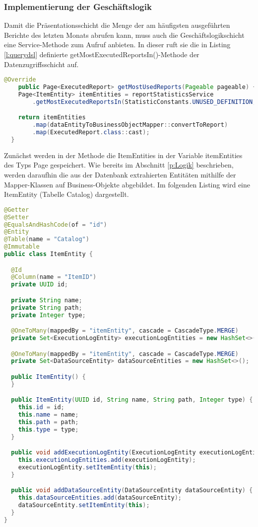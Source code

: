 \subsubsection{Implementierung der Geschäftslogik}
\label{sec:ImplementierungGeschaeftslogik}
Damit die Präsentationsschicht die Menge der am häufigsten ausgeführten Berichte des letzten Monats abrufen kann, muss auch die Geschäftslogikschicht eine Service-Methode zum Aufruf anbieten. In dieser ruft sie die in Listing \ref{l:querydsl} definierte getMostExecutedReportsIn()-Methode der Datenzugriffsschicht auf.
\begin{lstlisting}[language=Java,caption={getMostUsedReports()-Methode des ReportServices},label={l:getMostUsedReports}]
	@Override
  	public Page<ExecutedReport> getMostUsedReports(Pageable pageable) {
    Page<ItemEntity> itemEntities = reportStatisticsService
        .getMostExecutedReportsIn(StatisticConstants.UNUSED_DEFINITION, pageable);

    return itemEntities
        .map(dataEntityToBusinessObjectMapper::convertToReport)
        .map(ExecutedReport.class::cast);
  }
\end{lstlisting}
Zunächst werden in der Methode die ItemEntities in der Variable itemEntities des Typs Page gespeichert.
Wie bereits im Abschnitt \ref{p:Logik} beschrieben, werden daraufhin die aus der Datenbank extrahierten Entitäten mithilfe der Mapper-Klassen auf Business-Objekte abgebildet. Im folgenden Listing wird eine ItemEntity (Tabelle Catalog) dargestellt.
\begin{lstlisting}[language=Java,caption={ItemEntity}]
@Getter
@Setter
@EqualsAndHashCode(of = "id")
@Entity
@Table(name = "Catalog")
@Immutable
public class ItemEntity {

  @Id
  @Column(name = "ItemID")
  private UUID id;

  private String name;
  private String path;
  private Integer type;

  @OneToMany(mappedBy = "itemEntity", cascade = CascadeType.MERGE)
  private Set<ExecutionLogEntity> executionLogEntities = new HashSet<>();

  @OneToMany(mappedBy = "itemEntity", cascade = CascadeType.MERGE)
  private Set<DataSourceEntity> dataSourceEntities = new HashSet<>();

  public ItemEntity() {
  }

  public ItemEntity(UUID id, String name, String path, Integer type) {
    this.id = id;
    this.name = name;
    this.path = path;
    this.type = type;
  }

  public void addExecutionLogEntity(ExecutionLogEntity executionLogEntity) {
    this.executionLogEntities.add(executionLogEntity);
    executionLogEntity.setItemEntity(this);
  }

  public void addDataSourceEntity(DataSourceEntity dataSourceEntity) {
    this.dataSourceEntities.add(dataSourceEntity);
    dataSourceEntity.setItemEntity(this);
  }
}
\end{lstlisting}
